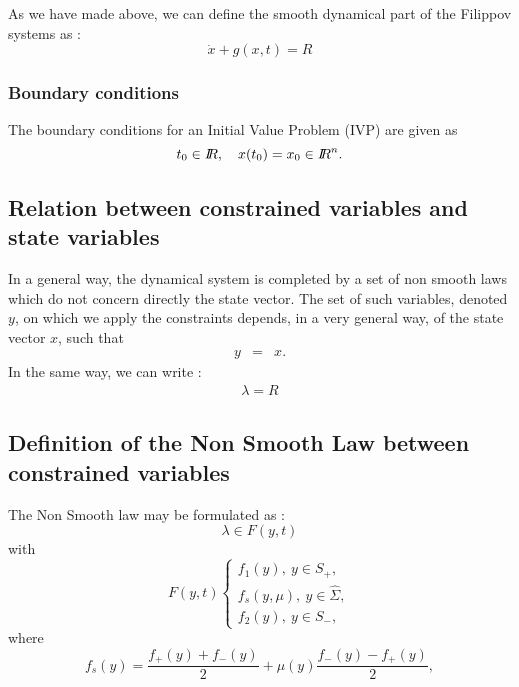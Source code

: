 \documentclass[10pt]{article}
\begin{document}
As we have made above, we can define the smooth dynamical part of the Filippov systems as :
  \begin{equation}
    \dot x +g(x,t) = R
  \end{equation}

\subsubsection*{Boundary conditions}
The boundary conditions for an Initial Value Problem (IVP) are given as
\begin{equation}
  \label{eq:3}
  t_0 \in \mbox{\rm $I\!\!R$},\quad x(t_0)=x_0 \in \mbox{\rm $I\!\!R$}^{n}.
\end{equation}

\subsection{Relation between constrained variables and state variables}
\label{Sec:Relation}



In a general way, the dynamical system is completed by a set of non smooth laws which do not  concern  directly the state vector. The set of such variables, denoted $y$, on which we apply the constraints depends, in a very general way, of the state vector $x$, such that
\begin{eqnarray}
  \label{eq:y}
  y &=&x.
\end{eqnarray}
In the same way, we can write :
   \begin{eqnarray}
    \lambda =R
  \end{eqnarray}



\subsection{Definition of the Non Smooth Law between constrained variables}
\label{Sec:NonSmoothLaw}

The Non Smooth law may be formulated as :
\begin{equation}
  \label{eq:2}
\lambda \in  F(y,t)
\end{equation}
with 
\begin{equation}
  \label{eq:2}
F(y,t)\left\{\begin{array}{l} 
        f_1(y), \ y \in S_+, \\
        f_s(y,\mu), \ y \in \hat{\Sigma},\\
        f_2(y), \ y \in S_-,
\end{array}\right.
\end{equation}
where
\begin{equation}
f_s(y) = \frac{f_+(y)+f_-(y)}{2}+ \mu(y)\frac{f_-(y)-f_+(y)}{2},
\label{eq:sliding_v_field}
\end{equation}
\end{document}
